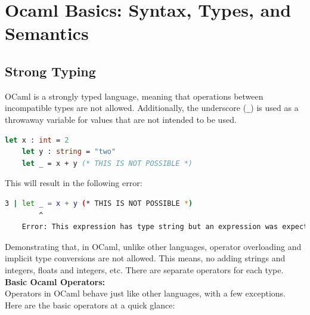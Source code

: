 \newpage
\section{Ocaml Basics: Syntax, Types, and Semantics}

\subsection*{Strong Typing}

OCaml is a strongly typed language, meaning that operations between incompatible types are not allowed. Additionally, the underscore (\texttt{\_}) is used as a throwaway variable for values that are not intended to be used.

\begin{lstlisting}[language=OCaml, caption={Example of Strong Typing}]
    let x : int = 2
    let y : string = "two"
    let _ = x + y (* THIS IS NOT POSSIBLE *)
\end{lstlisting}

\noindent
This will result in the following error:
\begin{lstlisting}[language=Bash, caption={Error Message}]
    3 | let _ = x + y (* THIS IS NOT POSSIBLE *)
        ^ 
    Error: This expression has type string but an expression was expected of type int
\end{lstlisting}

\noindent
Demonstrating that, in OCaml, unlike other languages, operator overloading and implicit type conversions are not allowed.
This means, no adding strings and integers, floats and integers, etc. There are separate operators for each type.\\

\noindent
\textbf{Basic Ocaml Operators:}\\
Operators in OCaml behave just like other languages, with a few exceptions. Here are the basic operators at a quick
glance:

